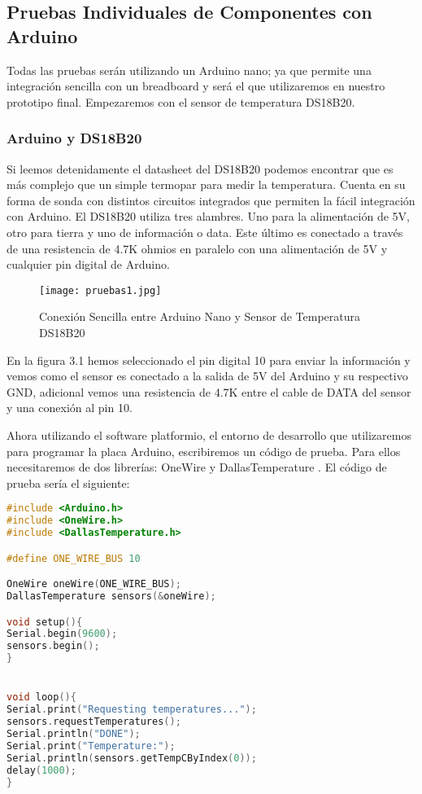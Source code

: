\subsection{Pruebas Individuales de Componentes con Arduino }
\par \noindent
Todas las pruebas serán utilizando un Arduino nano; ya que permite una integración sencilla con un breadboard y será el que utilizaremos en nuestro prototipo final. Empezaremos con el sensor de temperatura DS18B20.

\subsubsection{Arduino y DS18B20}
\par 
Si leemos detenidamente el datasheet del DS18B20 podemos encontrar que es más complejo que un simple termopar para medir la temperatura. Cuenta en su forma de sonda con distintos circuitos integrados que permiten la fácil integración con Arduino. El DS18B20 utiliza tres alambres. Uno para la alimentación de 5V, otro para tierra y uno de información o data. Este último es conectado a través de una resistencia de 4.7K ohmios en paralelo con una alimentación de 5V y cualquier pin digital de Arduino. 

\begin{figure}[H]
	\centering
	\texttt{[image: pruebas1.jpg]}
	\caption{Conexión Sencilla entre Arduino Nano y Sensor de Temperatura DS18B20}
\end{figure}

\par \noindent
En la figura 3.1 hemos seleccionado el pin digital 10 para enviar la información y vemos como el sensor es conectado a la salida de 5V del Arduino y su respectivo GND, adicional vemos una resistencia de 4.7K entre el cable de DATA del sensor y una conexión al pin 10. 

\par \noindent
Ahora utilizando el software platformio, el entorno de desarrollo que utilizaremos para programar la placa Arduino, escribiremos un código de prueba. Para ellos necesitaremos de dos librerías: OneWire \cite{onewire-github} y DallasTemperature \cite{dallas-github}. El código de prueba sería el siguiente: \\

\begin{lstlisting}[language=C++, caption={Código Ejemplo para DS18B20}, captionpos=b]
#include <Arduino.h>
#include <OneWire.h>
#include <DallasTemperature.h>

#define ONE_WIRE_BUS 10

OneWire oneWire(ONE_WIRE_BUS);
DallasTemperature sensors(&oneWire);

void setup(){
Serial.begin(9600);
sensors.begin();
}


void loop(){
Serial.print("Requesting temperatures...");
sensors.requestTemperatures(); 
Serial.println("DONE");
Serial.print("Temperature:");
Serial.println(sensors.getTempCByIndex(0));
delay(1000);
}
\end{lstlisting}


